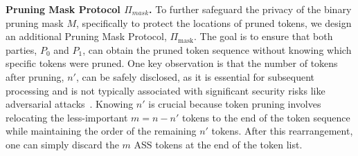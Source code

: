 \noindent\textbf{Pruning Mask Protocol $\Pi_{mask}$.}
\label{sec:mask}
To further safeguard the privacy of the binary pruning mask \( M \), specifically to protect the locations of pruned tokens, we design an additional Pruning Mask Protocol, \( \Pi_{\text{mask}} \). The goal is to ensure that both parties, \( P_0 \) and \( P_1 \), can obtain the pruned token sequence without knowing which specific tokens were pruned. One key observation is that the number of tokens after pruning, $n'$, can be safely disclosed, as it is essential for subsequent processing and is not typically associated with significant security risks like adversarial attacks~\citep{cui2021sparsity}. Knowing $n'$ is crucial because token pruning involves relocating the less-important $m = n - n'$ tokens to the end of the token sequence while maintaining the order of the remaining $n'$ tokens. After this rearrangement, one can simply discard the $m$ ASS tokens at the end of the token list.



